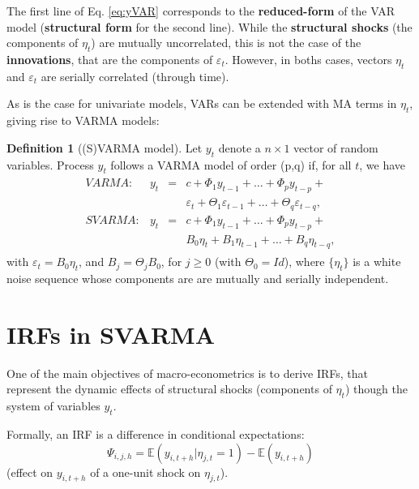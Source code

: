 \documentclass[
  12pt,
]{book}
\theoremstyle{definition}
\newtheorem{definition}{Definition}[chapter]
\theoremstyle{definition}
\theoremstyle{definition}
\theoremstyle{definition}
\theoremstyle{remark}
\begin{document}
The first line of Eq. \eqref{eq:yVAR} corresponds to the \textbf{reduced-form} of the VAR model (\textbf{structural form} for the second line). While the \textbf{structural shocks} (the components of \(\eta_t\)) are mutually uncorrelated, this is not the case of the \textbf{innovations}, that are the components of \(\varepsilon_t\). However, in boths cases, vectors \(\eta_t\) and \(\varepsilon_t\) are serially correlated (through time).

As is the case for univariate models, VARs can be extended with MA terms in \(\eta_t\), giving rise to VARMA models:

\begin{definition}[(S)VARMA model]
\protect\hypertarget{def:SVARMA}{}\label{def:SVARMA}Let \(y_{t}\) denote a \(n \times1\) vector of random variables. Process \(y_{t}\) follows a VARMA model of order (p,q) if, for all \(t\), we have
\begin{eqnarray}
\begin{array}{rllll}
VARMA:& y_t &=& c + \Phi_1 y_{t-1} + \dots + \Phi_p y_{t-p} + \\
&&&\varepsilon_t + \Theta_1\varepsilon_{t-1} + \dots + \Theta_q \varepsilon_{t-q},\\
SVARMA:& y_t &=& c + \Phi_1 y_{t-1} + \dots + \Phi_p y_{t-p} + \\
&&& B_0 \eta_t+ B_1 \eta_{t-1} + \dots +  B_q \eta_{t-q},
\end{array}\label{eq:yVARMA}
\end{eqnarray}
with \(\varepsilon_t = B_0\eta_t\), and \(B_j = \Theta_j B_0\), for \(j \ge 0\) (with \(\Theta_0 = Id\)), where \(\{\eta_{t}\}\) is a white noise sequence whose components are are mutually and serially independent.
\end{definition}

\hypertarget{IRFSVARMA}{%
\section{IRFs in SVARMA}\label{IRFSVARMA}}

One of the main objectives of macro-econometrics is to derive IRFs, that represent the dynamic effects of structural shocks (components of \(\eta_t\)) though the system of variables \(y_t\).

Formally, an IRF is a difference in conditional expectations:
\begin{equation}
\boxed{\Psi_{i,j,h} = \mathbb{E}(y_{i,t+h}|\eta_{j,t}=1) - \mathbb{E}(y_{i,t+h})}\label{eq:boxIRFs}
\end{equation}
(effect on \(y_{i,t+h}\) of a one-unit shock on \(\eta_{j,t}\)).
\end{document}
